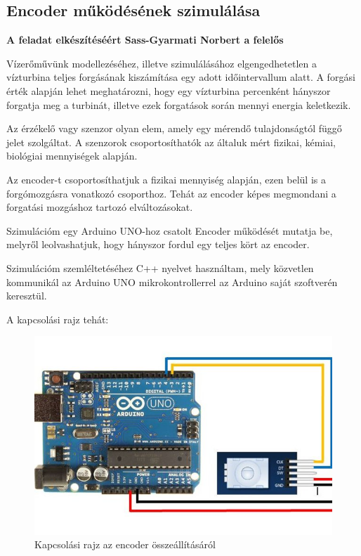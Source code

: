\documentclass[
]{thesis-ekf}
\theoremstyle{definition}
\theoremstyle{remark}
\begin{document}
		\subsection{Encoder működésének szimulálása}
			\textbf{A feladat elkészítéséért Sass-Gyarmati Norbert a felelős}
			\par Vízerőművünk modellezéséhez, illetve szimulálásához elgengedhetetlen a vízturbina teljes forgásának kiszámítása egy adott időintervallum alatt. A forgási érték alapján lehet meghatározni, hogy egy vízturbina percenként hányszor forgatja meg a turbinát, illetve ezek forgatások során mennyi energia keletkezik.
			\par Az érzékelő vagy szenzor olyan elem, amely egy mérendő tulajdonságtól függő jelet szolgáltat. A szenzorok csoportosíthatók az általuk mért fizikai, kémiai, biológiai mennyiségek alapján.\cite{encoder} 
			\par Az encoder-t csoportosíthatjuk a fizikai mennyiség alapján, ezen belül is a forgómozgásra vonatkozó csoporthoz. Tehát az encoder képes megmondani a forgatási mozgáshoz tartozó elváltozásokat.
			\par Szimulációm egy Arduino UNO-hoz csatolt Encoder működését mutatja be, melyről leolvashatjuk, hogy hányszor fordul egy teljes kört az encoder. 
			\par Szimulációm szemléltetéséhez C++ nyelvet használtam, mely közvetlen kommunikál az Arduino UNO mikrokontrollerrel az Arduino saját szoftverén keresztül. 
			\par A kapcsolási rajz tehát:
			\begin{figure}[H]
				\centering
				\includegraphics[scale=0.35]{./images/encoderplan}
				\caption{Kapcsolási rajz az encoder összeállításáról}
			\end{figure}
\end{document}
